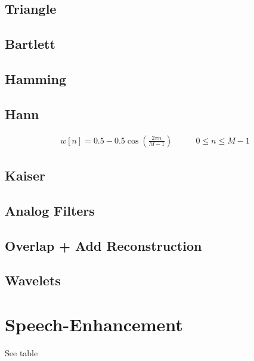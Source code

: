 \subsection{Triangle}
\subsection{Bartlett}
\subsection{Hamming}
\subsection{Hann}
\begin{align}
    w[n] = 0.5 - 0.5\cos\left( \frac{ 2\pi n }{ M - 1 } \right) & \qquad 0 \leq n \leq M-1
\end{align}


\subsection{Kaiser}
\subsection{Analog Filters}

\subsection{Overlap + Add Reconstruction}
\subsection{Wavelets}

\section{Speech-Enhancement}
See table








